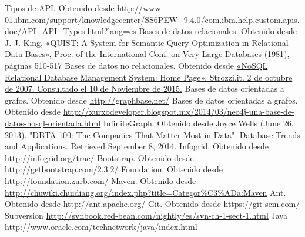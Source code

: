 \begin{thebibliography}{1}
   Tipos de API. Obtenido desde \url{http://www-01.ibm.com/support/knowledgecenter/SS6PEW_9.4.0/com.ibm.help.custom.apis.doc/API_API_Types.html?lang=es}
   Bases de datos relacionales. Obtenido desde J. J. King, «QUIST: A System for Semantic Query Optimization in Relational Data Bases», Proc. of the International Conf. on Very Large Databases (1981),
páginas 510-517
   Bases de datos no relacionales. Obtenido desde \url{ «NoSQL Relational Database Management System: Home Page». Strozzi.it. 2 de octubre de 2007. Consultado el 10 de Noviembre de 2015.}
   Bases de datos orientadas a grafos. Obtenido desde \url{ http://graphbase.net/}
   Bases de datos orientadas a grafos. Obtenido desde \url{ http://xurxodeveloper.blogspot.mx/2014/03/neo4j-una-base-de-datos-nosql-orientada.html}
   InfiniteGraph. Obtenido desde  Joyce Wells (June 26, 2013). "DBTA 100: The Companies That Matter Most in Data". Database Trends and Applications. Retrieved September 8, 2014.
   Infogrid. Obtenido desde  \url{http://infogrid.org/trac/}
   Bootstrap. Obtenido desde  \url{http://getbootstrap.com/2.3.2/}
   Foundation. Obtenido desde  \url{http://foundation.zurb.com/}
   Maven. Obtenido desde  \url{http://chuwiki.chuidiang.org/index.php?title=Categor%C3%ADa:Maven}
   Ant. Obtenido desde  \url{http://ant.apache.org/}
   Git. Obtenido desde  \url{https://git-scm.com/}
   Subversion \url{http://svnbook.red-bean.com/nightly/es/svn-ch-1-sect-1.html}
   Java \url{http://www.oracle.com/technetwork/java/index.html}

\end{thebibliography}


